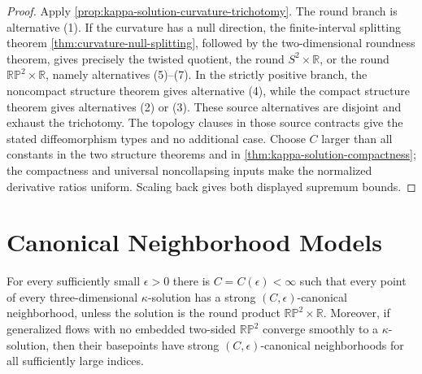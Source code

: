 \begin{proof}
Apply \ref{prop:kappa-solution-curvature-trichotomy}.  The round branch is
alternative (1).  If the curvature has a null direction, the finite-interval
splitting theorem \ref{thm:curvature-null-splitting}, followed by the
two-dimensional roundness theorem, gives precisely the twisted quotient, the
round $S^2\times\mathbb R$, or the round
$\mathbb{RP}^2\times\mathbb R$, namely alternatives (5)--(7).  In the
strictly positive branch, the noncompact structure theorem gives alternative
(4), while the compact structure theorem gives alternatives (2) or (3).
These source alternatives are disjoint and exhaust the trichotomy.  The
topology clauses in those source contracts give the stated diffeomorphism
types and no additional case.
Choose $C$ larger than all constants in the two structure theorems and in
\ref{thm:kappa-solution-compactness}; the compactness and universal
noncollapsing inputs make the normalized derivative ratios uniform.  Scaling
back gives both displayed supremum bounds.
\end{proof}

\section{Canonical Neighborhood Models}

\begin{theorem}
\label{thm:kappa-solution-canonical-neighborhoods}
\notready
For every sufficiently small $\epsilon>0$ there is
$C=C(\epsilon)<\infty$ such that every point of every three-dimensional
$\kappa$-solution has a strong $(C,\epsilon)$-canonical neighborhood,
unless the solution is the round product $\mathbb{RP}^2\times\mathbb R$.
Moreover, if generalized flows with no embedded two-sided
$\mathbb{RP}^2$ converge smoothly to a $\kappa$-solution, then their
basepoints have strong $(C,\epsilon)$-canonical neighborhoods for all
sufficiently large indices.
\end{theorem}

